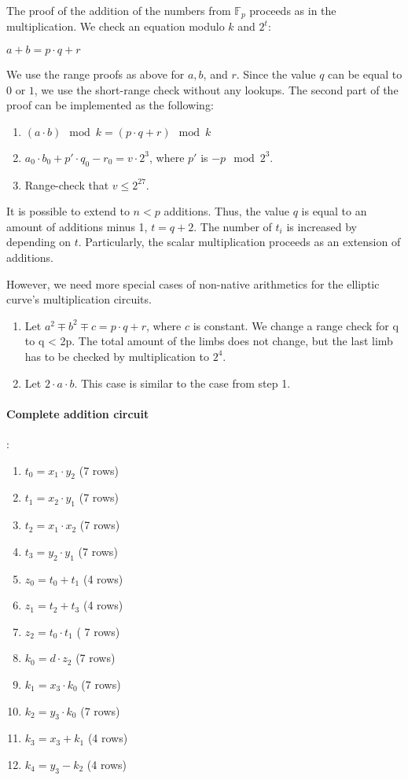 The proof of the addition of the numbers from $\mathbb{F}_p$ proceeds as in the multiplication.
We check an equation modulo $k$ and $2^t$:
\begin{center}
$a + b = p\cdot q + r$
\end{center}
We use the range proofs as above for $a, b$, and $r$.
Since the value $q$ can be equal to $0$ or $1$, we use the short-range check without any lookups.
The second part of the proof can be implemented as the following:
\begin{enumerate}
\item $(a\cdot b) \mod k = (p \cdot q + r) \mod k$
\item $a_0 \cdot b_0 + p'\cdot q_0 - r_0 = v \cdot 2^3$, where $p'$ is $- p \mod 2^3$.
\item Range-check that $v \leq 2^{27}$.
\end{enumerate} 
It is possible to extend to $n < p$ additions.
Thus, the value $q$ is equal to an amount of additions minus 1, $t = q + 2$.
The number of $t_i $ is increased by depending on $t$.
Particularly, the scalar multiplication proceeds as an extension of additions.

However, we need more special cases of non-native arithmetics for the elliptic curve's multiplication circuits.
\begin{enumerate}
\item Let $a^2 \mp b^2 \mp c = p \cdot q + r$, where $c$ is constant. 
We change a range check for q to q < 2p.
The total amount of the limbs does not change, but the last limb has to be checked by multiplication to $2^4$.
\item Let $2 \cdot a \cdot b$.
This case is similar to the case from step 1.
\end{enumerate}

\paragraph{Complete addition circuit}:
\begin{enumerate}
\item $t_0 = x_1 \cdot y_2$ (7 rows)
\item $t_1 =  x_2 \cdot y_1$ (7 rows)
\item $t_2 =  x_1 \cdot x_2$ (7 rows)
\item $t_3 =  y_2 \cdot y_1$ (7 rows)
\item $z_0 = t_0 + t_1$ (4 rows)
\item $z_1 = t_2 + t_3$ (4 rows)
\item $z_2 = t_0 \cdot t_1$ ( 7 rows)
\item $k_0 = d \cdot z_2$ (7 rows)
\item $k_1 = x_3 \cdot k_0$ (7 rows)
\item $k_2 = y_3 \cdot k_0$ (7 rows)
\item $k_3 = x_3 + k_1$ (4 rows)
\item $k_4 = y_3 - k_2$ (4 rows)
\end{enumerate}

